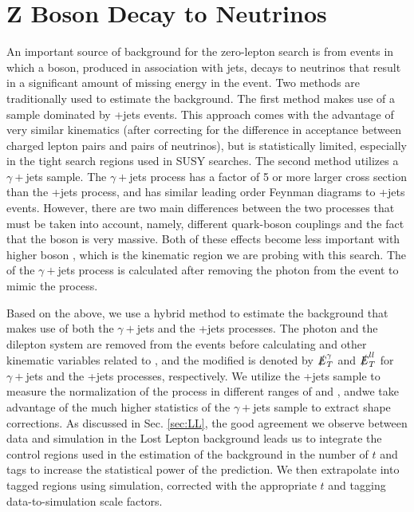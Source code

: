 \section{Z Boson Decay to Neutrinos}
\label{subsec:Znunu}

An important source of background for the zero-lepton search is from events in which a \Z{} boson, produced in association with jets, decays to neutrinos that result in a significant amount of missing energy in the event. Two methods are traditionally used to estimate the \Znunu{} background. The first method makes use of a sample dominated by \Zll+jets events. This approach comes with the advantage of very similar kinematics (after correcting for the difference in acceptance between charged lepton pairs and pairs of neutrinos), but is statistically limited, especially in the tight search regions used in SUSY searches. The second method utilizes a $\gamma+$jets sample. The $\gamma+$jets process has a factor of 5 or more larger cross section than the \Zll+jets process, and has similar leading order Feynman diagrams to \Z+jets events. However, there are two main differences between the two processes that must be taken into account, namely, different quark-boson couplings and the fact that the \Z{} boson is very massive. Both of these effects become less important with higher boson \pt, which is the kinematic region we are probing with this search. The \met{} of the $\gamma+$jets process is calculated after removing the photon from the event to mimic the \Znunu{} process.

Based on the above, we use a hybrid method to estimate the \Znunu{} background that makes use of both the $\gamma+$jets and the \Zll+jets processes. The photon and the dilepton system are removed from the events before calculating \met{} and other kinematic variables related to \met, and the modified \met{} is denoted by $\slashed{E}_{T}^\gamma$ and $\slashed{E}_{T}^{ll}$ for $\gamma+$jets and the \Zll+jets processes, respectively. We utilize the \Zll+jets sample to measure the normalization of the \Znunu{} process in different ranges of \nb{} and \nsv, andwe take advantage of the much higher statistics of the $\gamma+$jets sample to extract shape corrections. As discussed in Sec. \ref{sec:LL}, the good agreement we observe between data and simulation in the Lost Lepton background leads us to integrate the control regions used in the estimation of the \Znunu{} background in the number of $t$ and \W{} tags to increase the statistical power of the prediction. We then extrapolate into tagged regions using simulation, corrected with the appropriate $t$ and \W{} tagging data-to-simulation scale factors.


